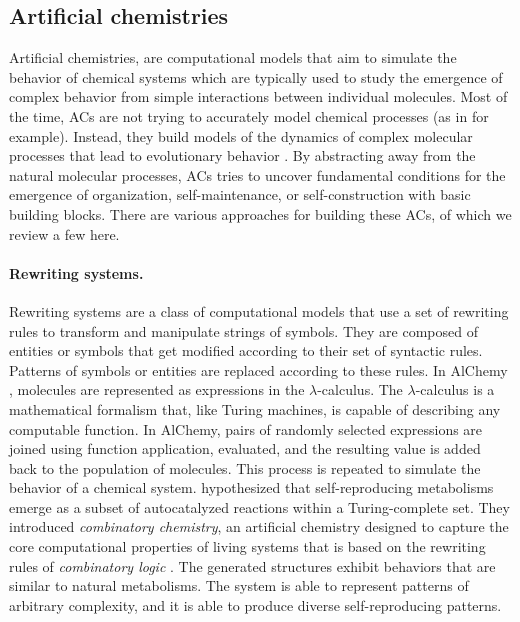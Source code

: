 \subsection{Artificial chemistries}
Artificial chemistries, are computational models that aim to simulate the
behavior of chemical systems which are typically used to study the emergence of
complex behavior from simple interactions between individual molecules. Most of
the time, \acp{AC} are not trying to accurately model chemical processes (as in
\parencite{ostrovskyCellularAutomataPolymer2001,
  buligaChemlambdaUniversalitySelfmultiplication2014,
  bedauLessAbstractArtificial2000 ,sayamaSeekingOpenendedEvolution2011} for
example). Instead, they build models of the dynamics of complex molecular
processes that lead to evolutionary behavior
\parencite{dittrichArtificialChemistriesReview2001}. By abstracting away from
the natural molecular processes, \acp{AC} tries to uncover fundamental
conditions for the emergence of organization, self-maintenance, or
self-construction with basic building blocks. There are various approaches for
building these \aclp{AC}, of which we review a few here.

\paragraph{Rewriting systems.}
Rewriting systems are a class of computational models that use a set of
rewriting rules to transform and manipulate strings of symbols. They are
composed of entities or symbols that get modified according to their set of
syntactic rules. Patterns of symbols or entities are replaced according to these
rules. In AlChemy \parencite{fontanaWhatWouldBe1994}, molecules are represented
as expressions in the $\lambda$-calculus. The $\lambda$-calculus is a mathematical formalism
that, like Turing machines, is capable of describing any computable function. In
AlChemy, pairs of randomly selected expressions are joined using function
application, evaluated, and the resulting value is added back to the population
of molecules. This process is repeated to simulate the behavior of a chemical
system. \textcite{kruszewskiEmergenceSelfReproducingMetabolisms2022}
hypothesized that self-reproducing metabolisms emerge as a subset of
autocatalyzed reactions within a Turing-complete set. They introduced
\emph{combinatory chemistry}, an artificial chemistry designed to capture the
core computational properties of living systems that is based on the rewriting
rules of \emph{combinatory logic} \parencite{curryCombinatoryLogic1958,
  schoenfinkelUeberBausteineMathematischen1924}. The generated structures
exhibit behaviors that are similar to natural metabolisms. The system is able to
represent patterns of arbitrary complexity, and it is able to produce diverse
self-reproducing patterns.

